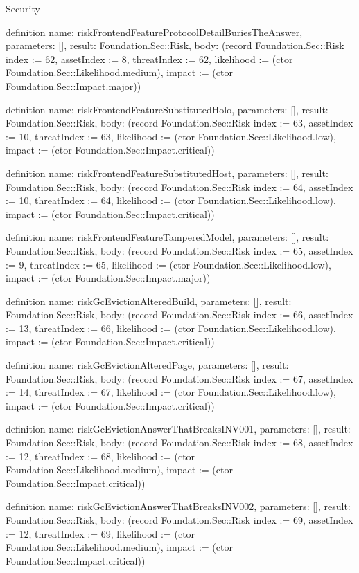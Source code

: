 \begin{lexlean}{Security}
\begin{semanticmodule}
definition{
  name: riskFrontendFeatureProtocolDetailBuriesTheAnswer,
  parameters: [],
  result: Foundation.Sec::Risk,
  body: (record Foundation.Sec::Risk {index := 62, assetIndex := 8, threatIndex := 62, likelihood := (ctor Foundation.Sec::Likelihood.medium), impact := (ctor Foundation.Sec::Impact.major)})
}

definition{
  name: riskFrontendFeatureSubstitutedHolo,
  parameters: [],
  result: Foundation.Sec::Risk,
  body: (record Foundation.Sec::Risk {index := 63, assetIndex := 10, threatIndex := 63, likelihood := (ctor Foundation.Sec::Likelihood.low), impact := (ctor Foundation.Sec::Impact.critical)})
}

definition{
  name: riskFrontendFeatureSubstitutedHost,
  parameters: [],
  result: Foundation.Sec::Risk,
  body: (record Foundation.Sec::Risk {index := 64, assetIndex := 10, threatIndex := 64, likelihood := (ctor Foundation.Sec::Likelihood.low), impact := (ctor Foundation.Sec::Impact.critical)})
}

definition{
  name: riskFrontendFeatureTamperedModel,
  parameters: [],
  result: Foundation.Sec::Risk,
  body: (record Foundation.Sec::Risk {index := 65, assetIndex := 9, threatIndex := 65, likelihood := (ctor Foundation.Sec::Likelihood.low), impact := (ctor Foundation.Sec::Impact.major)})
}

definition{
  name: riskGcEvictionAlteredBuild,
  parameters: [],
  result: Foundation.Sec::Risk,
  body: (record Foundation.Sec::Risk {index := 66, assetIndex := 13, threatIndex := 66, likelihood := (ctor Foundation.Sec::Likelihood.low), impact := (ctor Foundation.Sec::Impact.critical)})
}

definition{
  name: riskGcEvictionAlteredPage,
  parameters: [],
  result: Foundation.Sec::Risk,
  body: (record Foundation.Sec::Risk {index := 67, assetIndex := 14, threatIndex := 67, likelihood := (ctor Foundation.Sec::Likelihood.low), impact := (ctor Foundation.Sec::Impact.critical)})
}

definition{
  name: riskGcEvictionAnswerThatBreaksINV001,
  parameters: [],
  result: Foundation.Sec::Risk,
  body: (record Foundation.Sec::Risk {index := 68, assetIndex := 12, threatIndex := 68, likelihood := (ctor Foundation.Sec::Likelihood.medium), impact := (ctor Foundation.Sec::Impact.critical)})
}

definition{
  name: riskGcEvictionAnswerThatBreaksINV002,
  parameters: [],
  result: Foundation.Sec::Risk,
  body: (record Foundation.Sec::Risk {index := 69, assetIndex := 12, threatIndex := 69, likelihood := (ctor Foundation.Sec::Likelihood.medium), impact := (ctor Foundation.Sec::Impact.critical)})
}


\end{semanticmodule}
\end{lexlean}
